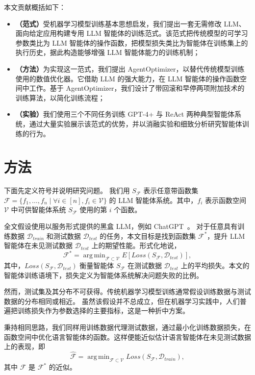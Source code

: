 \documentclass{article}
\DeclareMathOperator*{\argmin}{arg\,min}
\begin{document}
本文贡献概括如下：
\begin{itemize}
  \item \textbf{（范式）}受机器学习模型训练基本思想启发，我们提出一套无需修改 LLM、面向给定应用构建专用 LLM 智能体的训练范式。该范式把传统模型的可学习参数类比为 LLM 智能体的操作函数，把模型损失类比为智能体在训练集上的执行历史，据此构造能够增强 LLM 智能体能力的训练机制；
  \item \textbf{（方法）}为实现这一范式，我们提出 AgentOptimizer，以替代传统模型训练使用的数值优化器。它借助 LLM 的强大能力，在 LLM 智能体的操作函数空间中工作。基于 AgentOptimizer，我们设计了带回滚和早停两项附加技术的训练算法，以简化训练流程；
  \item \textbf{（实验）}我们使用三个不同任务训练 GPT-4+ 与 ReAct 两种典型智能体系统，通过大量实验展示该范式的优势，并以消融实验和细致分析研究智能体训练的行为。
\end{itemize}

\section{方法}

下面先定义符号并说明研究问题。
我们用 $S_{\mathcal{F}}$ 表示任意带函数集 $\mathcal{F}=\{f_{1},\ldots,f_{n}\mid \forall i\in[n],f_i\in\mathcal{V}\}$ 的 LLM 智能体系统。其中，$f_i$ 表示函数空间 $\mathcal{V}$ 中可供智能体系统 $S_{\mathcal{F}}$ 使用的第 $i$ 个函数。

全文假设使用以服务形式提供的黑盒 LLM，例如 ChatGPT~\cite{openai2022gpt}。
对于任意具有训练数据 $\mathcal{D}_{train}$ 和测试数据 $\mathcal{D}_{test}$ 的任务，本文目标是找到函数集 $\mathcal{F}^{*}$，提升 LLM 智能体在未见测试数据 $\mathcal{D}_{test}$ 上的期望性能。形式化地说，
\begin{equation}
\label{eq:final_goal}
\mathcal{F}^{*}=\argmin_{\mathcal{F}\subset\mathcal{V}}E[Loss(S_{\mathcal{F}},\mathcal{D}_{test})],
\end{equation}
其中，$Loss(S_{\mathcal{F}},\mathcal{D}_{test})$ 衡量智能体 $S_{\mathcal{F}}$ 在测试数据 $\mathcal{D}_{test}$ 上的平均损失。本文的智能体训练语境下，损失定义为智能体系统解决问题失败的比例。

然而，测试集及其分布不可获得。传统机器学习模型训练通常假设训练数据与测试数据的分布相同或相近。
虽然该假设并不总成立，但在机器学习实践中，人们普遍把训练损失作为参数选择的主要指标，这是一种折中方案。

秉持相同思路，我们同样用训练数据代理测试数据，通过最小化训练数据损失，在函数空间中优化语言智能体的函数。这样便能近似估计语言智能体在未见测试数据上的表现，即
\[
\hat{\mathcal{F}}=\argmin_{\mathcal{F}\subset\mathcal{V}}Loss(S_{\mathcal{F}},\mathcal{D}_{train}),
\]
其中 $\hat{\mathcal{F}}$ 是 $\mathcal{F}^{*}$ 的近似。
\end{document}
